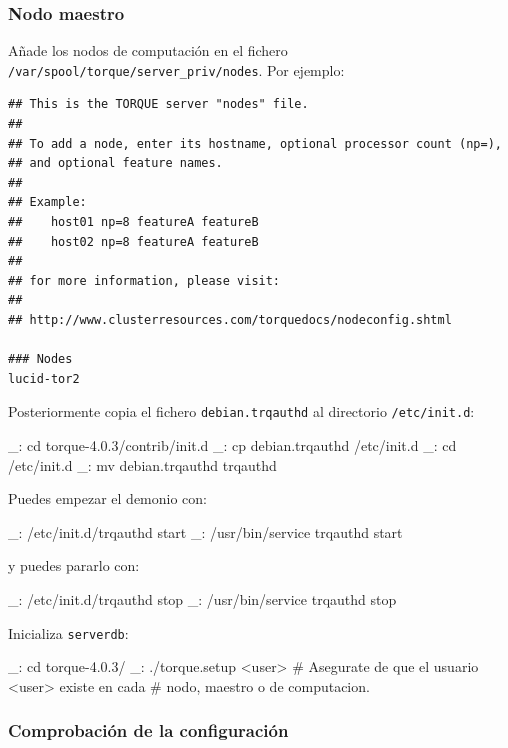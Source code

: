 \subsubsection{Nodo maestro}
\label{anx:inst-torque-conf-maestro}

Añade los nodos de computación en el fichero \texttt{/var/spool/torque/server\_priv/nodes}. Por ejemplo:

\begin{lstlisting}
## This is the TORQUE server "nodes" file. 
## 
## To add a node, enter its hostname, optional processor count (np=), 
## and optional feature names.
## 
## Example:
##    host01 np=8 featureA featureB 
##    host02 np=8 featureA featureB
## 
## for more information, please visit:
## 
## http://www.clusterresources.com/torquedocs/nodeconfig.shtml

### Nodes
lucid-tor2
\end{lstlisting}

Posteriormente copia el fichero \texttt{debian.trqauthd} al directorio \texttt{/etc/init.d}:

\begin{bashcode}
_: cd torque-4.0.3/contrib/init.d
_: cp debian.trqauthd /etc/init.d
_: cd /etc/init.d
_: mv debian.trqauthd trqauthd
\end{bashcode}

Puedes empezar el demonio con:

\begin{bashcode}
_: /etc/init.d/trqauthd start
_: /usr/bin/service trqauthd start
\end{bashcode}

y puedes pararlo con:

\begin{bashcode}
_: /etc/init.d/trqauthd stop
_: /usr/bin/service trqauthd stop
\end{bashcode}

Inicializa \texttt{serverdb}:

\begin{bashcode}
_: cd torque-4.0.3/
_: ./torque.setup <user>   # Asegurate de que el usuario <user> existe en cada
                           # nodo, maestro o de computacion.
\end{bashcode}


\subsubsection{Comprobación de la configuración}


